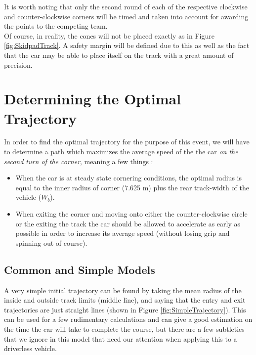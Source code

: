 \documentclass[a4paper, 11pt]{article}
\begin{document}
It is worth noting that only the second round of each of the respective clockwise and counter-clockwise corners will be timed and taken into account for awarding the points to the competing team.\\

Of course, in reality, the cones will not be placed exactly as in Figure \ref{fig:SkidpadTrack}. A safety margin will be defined due to this as well as the fact that the car may be able to place itself on the track with a great amount of precision.

\section{Determining the Optimal Trajectory}

In order to find the optimal trajectory for the purpose of this event, we will have to determine a path which maximizes the average speed of the the car \textit{on the second turn of the corner}, meaning a few things :
\begin{itemize}
	\item When the car is at steady state cornering conditions, the optimal radius is equal to the inner radius of corner (7.625 m) plus the rear track-width of the vehicle ($W_b$).
	\item When exiting the corner and moving onto either the counter-clockwise circle or the exiting the track the car should be allowed to accelerate as early as possible in order to increase its average speed (without losing grip and spinning out of course).
\end{itemize}

\subsection{Common and Simple Models}

A very simple initial trajectory can be found by taking the mean radius of the inside and outside track limits (middle line), and saying that the entry and exit trajectories are just straight lines (shown in Figure \ref{fig:SimpleTrajectory}). This can be used for a few rudimentary calculations and can give a good estimation on the time the car will take to complete the course, but there are a few subtleties that we ignore in this model that need our attention when applying this to a driverless vehicle.
\end{document}
